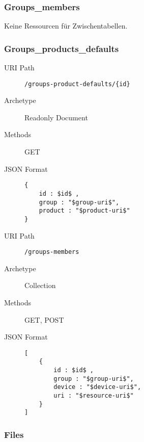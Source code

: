 \documentclass[10pt,a4paper]{scrartcl}
\begin{document}
\pagebreak
\subsubsection{Groups\_members}

Keine Ressourcen für Zwischentabellen.

\pagebreak
\subsubsection{Groups\_products\_defaults}

\begin{mdframed}[style=def]
\begin{description}
	\item[URI Path] \texttt{/groups-product-defaults/\{id\}}
	\item[Archetype] Readonly Document
	\item[Methods] GET
	\item[JSON Format] \hfill
\begin{lstlisting}
{
	id : $id$ ,
	group : "$group-uri$",
	product : "$product-uri$"
}
\end{lstlisting}
\end{description}
\end{mdframed}

\begin{mdframed}[style=def]
\begin{description}
	\item[URI Path] \texttt{/groups-members}
	\item[Archetype] Collection
	\item[Methods] GET, POST
	\item[JSON Format] \hfill
\begin{lstlisting}
[
	{
		id : $id$ ,
		group : "$group-uri$",
		device : "$device-uri$",
		uri : "$resource-uri$"
	}
]
\end{lstlisting}
\end{description}
\end{mdframed}


\pagebreak
\subsubsection{Files}
\end{document}

